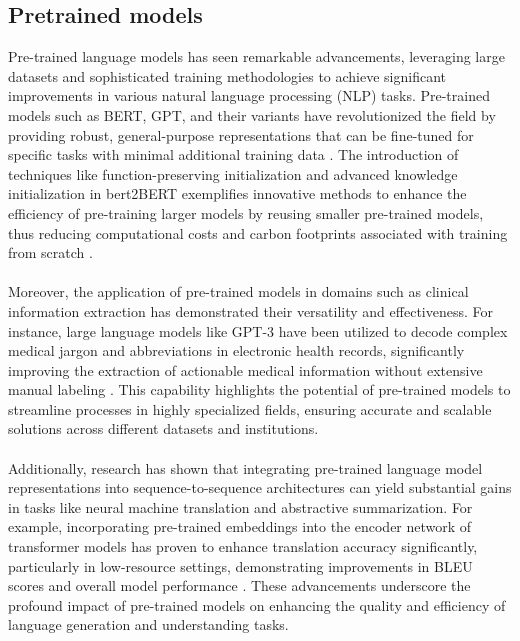 \subsection*{Pretrained models}
Pre-trained language models has seen remarkable advancements, leveraging large datasets and sophisticated training methodologies to achieve significant improvements in various natural language processing (NLP) tasks. Pre-trained models such as BERT, GPT, and their variants have revolutionized the field by providing robust, general-purpose representations that can be fine-tuned for specific tasks with minimal additional training data \cite{chen-etal-2022-bert2bert}. The introduction of techniques like function-preserving initialization and advanced knowledge initialization in bert2BERT exemplifies innovative methods to enhance the efficiency of pre-training larger models by reusing smaller pre-trained models, thus reducing computational costs and carbon footprints associated with training from scratch \cite{chen-etal-2022-bert2bert}.
\\\\
Moreover, the application of pre-trained models in domains such as clinical information extraction has demonstrated their versatility and effectiveness. For instance, large language models like GPT-3 have been utilized to decode complex medical jargon and abbreviations in electronic health records, significantly improving the extraction of actionable medical information without extensive manual labeling \cite{agrawal2022large}. This capability highlights the potential of pre-trained models to streamline processes in highly specialized fields, ensuring accurate and scalable solutions across different datasets and institutions.
\\\\
Additionally, research has shown that integrating pre-trained language model representations into sequence-to-sequence architectures can yield substantial gains in tasks like neural machine translation and abstractive summarization. For example, incorporating pre-trained embeddings into the encoder network of transformer models has proven to enhance translation accuracy significantly, particularly in low-resource settings, demonstrating improvements in BLEU scores and overall model performance \cite{edunov-etal-2019-pre}. These advancements underscore the profound impact of pre-trained models on enhancing the quality and efficiency of language generation and understanding tasks.

